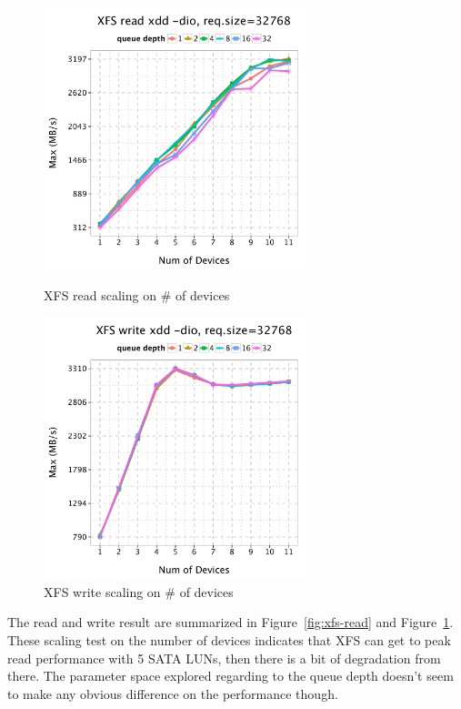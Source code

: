 \documentclass{article}
\begin{document}
\begin{figure}[htb]
\centering
\begin{minipage}[t]{0.5\linewidth}
\centering
\includegraphics[width=3in]{data/xdd-read}
\caption{XFS read scaling on \# of devices}
\label{fig:xfs-read}
\end{minipage}%
\begin{minipage}[t]{0.5\linewidth}
\centering
\includegraphics[width=3in]{data/xdd-write}
\caption{XFS write scaling on \# of devices}
\label{fig:xfs-write}
\end{minipage}%
\end{figure}

The read and write result are summarized in Figure~\ref{fig:xfs-read}
and Figure~\ref{fig:xfs-write}. These scaling test on the number of devices
indicates that XFS can get to peak read performance with 5 SATA LUNs, then there
is a bit of degradation from there. The parameter space explored regarding to
the queue depth doesn't seem to make any obvious difference on the performance
though.
\end{document}
